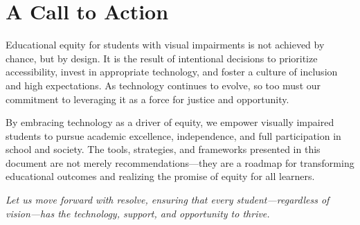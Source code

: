\section{A Call to Action}

Educational equity for students with visual impairments is not achieved by chance, but by design. It is the result of intentional decisions to prioritize accessibility, invest in appropriate technology, and foster a culture of inclusion and high expectations. As technology continues to evolve, so too must our commitment to leveraging it as a force for justice and opportunity.

By embracing technology as a driver of equity, we empower visually impaired students to pursue academic excellence, independence, and full participation in school and society. The tools, strategies, and frameworks presented in this document are not merely recommendations—they are a roadmap for transforming educational outcomes and realizing the promise of equity for all learners.

\bigskip

\noindent\textit{Let us move forward with resolve, ensuring that every student—regardless of vision—has the technology, support, and opportunity to thrive.}
